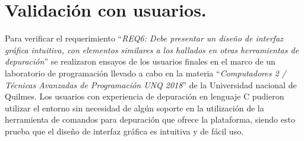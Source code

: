 \section{Validación con usuarios.}
\label{sec:Validación con usuarios.}

Para verificar el requerimiento “\emph{REQ6: Debe presentar un diseño de interfaz gráfica intuitiva, con elementos similares a los hallados en otras herramientas de depuración}” se realizaron ensayos de los usuarios finales en el marco de un laboratorio de programación llevado a cabo en la materia “\emph{Computadores 2 / Técnicas Avanzadas de Programación UNQ 2018}” \citep{computadores2unq2018} de la Universidad nacional de Quilmes. Los usuarios con experiencia de depuración en lenguaje C pudieron utilizar el entorno sin necesidad de algún soporte en la utilización de la herramienta de comandos para depuración que ofrece la plataforma, siendo esto prueba que el diseño de interfaz gráfica es intuitiva y de fácil uso.